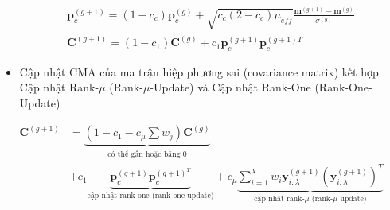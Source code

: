 \documentclass{book}
\begin{document}
\begin{itemize}
\begin{figure}[H]
        \end{figure}
        \begin{equation*}
            \begin{aligned}
            \mathbf{p}_c^{(g+1)}=(1-c_c)\mathbf{p}_c^{(g)}+\sqrt{c_c(2-c_c)\mu_{eff}}\frac{\mathbf{m}^{(g+1)}-\mathbf{m}^{(g)}}{\sigma^{(g)}} \\
            \mathbf{C}^{(g+1)}=(1-c_1)\mathbf{C}^{(g)}+c_1\mathbf{p}_c^{(g+1)}\mathbf{p}_c^{(g+1)T}
        \end{aligned}
        \end{equation*}
        \item Cập nhật CMA của ma trận hiệp phương sai (covariance matrix) kết hợp Cập nhật Rank-$\mu$ (Rank-$\mu$-Update) và Cập nhật Rank-One (Rank-One-Update)
    \end{itemize}
    \begin{equation*}
        \begin{aligned}
            \mathbf{C}^{(g+1)}&=\underbrace{(1-c_1-c_\mu\sum w_j)\mathbf{C}^{(g)}}_{\text{có thể gần hoặc bằng 0}} \\
            & + c_1 \underbrace{\mathbf{p}_c^{(g+1)}\mathbf{p}_{c}^{(g+1)^T}}_{\text{cập nhật rank-one (rank-one update)}} + c_\mu \underbrace{\sum_{i=1}^{\lambda}w_i\mathbf{y}_{i:\lambda}^{(g+1)}(\mathbf{y}_{i:\lambda}^{(g+1)})^T}_{\text{cập nhật rank-$\mu$ (rank-$\mu$ update)}}
        \end{aligned}
    \end{equation*}
\end{document}
